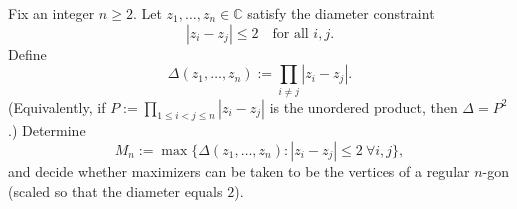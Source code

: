 Fix an integer $n\ge 2$. Let $z_1,\dots,z_n\in\mathbb C$ satisfy the diameter constraint
\[
  |z_i-z_j|\le 2\quad\text{for all }i,j.
\]
Define
\[
  \Delta(z_1,\dots,z_n):=\prod_{i\ne j}|z_i-z_j|.
\]
(Equivalently, if $P:=\prod_{1\le i<j\le n}|z_i-z_j|$ is the unordered product, then $\Delta=P^2$.)
Determine
\[
  M_n:=\max\{\Delta(z_1,\dots,z_n): |z_i-z_j|\le 2\ \forall i,j\},
\]
and decide whether maximizers can be taken to be the vertices of a regular $n$-gon (scaled so that the
diameter equals $2$).

